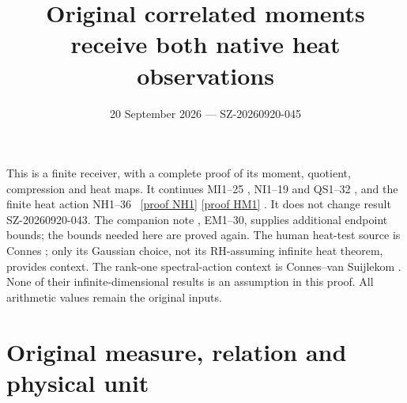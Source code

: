 \documentclass[11pt]{article}
\title{Original correlated moments receive both native heat observations}
\author{}\date{20 September 2026 --- SZ-20260920-045}
\begin{document}
\maketitle

This is a finite receiver, with a complete proof of its moment, quotient,
compression and heat maps. It continues MI1--25 \cite{MI}, NI1--19 and
QS1--32 \cite{NI}, and the finite heat action NH1--36 \cite{NH}%
~\href{https://github.com/KokunoYumeto/zeta-function-research-reader/blob/5992ad50c0f2a06921f1fcaded7b4e38097c0739/workbenches/splitzero-tandem/continuations/20260920-original-kernel-mixed-determinants/providers/NATIVE_HEAT_ACTION.tex\#L41}{[proof NH1]} \href{https://github.com/KokunoYumeto/zeta-function-research-reader/blob/5992ad50c0f2a06921f1fcaded7b4e38097c0739/workbenches/splitzero-tandem/continuations/20260920-original-kernel-mixed-determinants/providers/HEAT_METRIC_COMPARISON.tex\#L43}{[proof HM1]}%
{}.
It does not change result SZ-20260920-043. The companion note
, EM1--30,
supplies additional endpoint bounds; the bounds needed here are proved
again. The human heat-test source is Connes \cite{Connes}; only its
Gaussian choice, not its RH-assuming infinite heat theorem, provides
context. The rank-one spectral-action context is Connes--van Suijlekom
\cite{CV}. None of their infinite-dimensional results is an assumption
in this proof. All arithmetic values remain the original inputs.

\section{Original measure, relation and physical unit}
\end{document}
